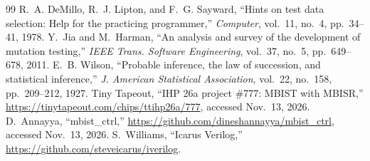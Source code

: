 \documentclass[conference]{IEEEtran}
\begin{document}
\begin{thebibliography}{99}
 R.~A. DeMillo, R.~J. Lipton, and F.~G. Sayward, ``Hints on test data selection: Help for the practicing programmer,'' \emph{Computer}, vol.~11, no.~4, pp.~34--41, 1978.
 Y.~Jia and M.~Harman, ``An analysis and survey of the development of mutation testing,'' \emph{IEEE Trans. Software Engineering}, vol.~37, no.~5, pp.~649--678, 2011.
 E.~B. Wilson, ``Probable inference, the law of succession, and statistical inference,'' \emph{J. American Statistical Association}, vol.~22, no.~158, pp.~209--212, 1927.
 Tiny Tapeout, ``IHP 26a project \#777: MBIST with MBISR,'' \url{https://tinytapeout.com/chips/ttihp26a/777}, accessed Nov.~13, 2026.
 D.~Annayya, ``mbist\_ctrl,'' \url{https://github.com/dineshannayya/mbist_ctrl}, accessed Nov.~13, 2026.
 S.~Williams, ``Icarus Verilog,'' \url{https://github.com/steveicarus/iverilog}.
\end{thebibliography}
\end{document}
